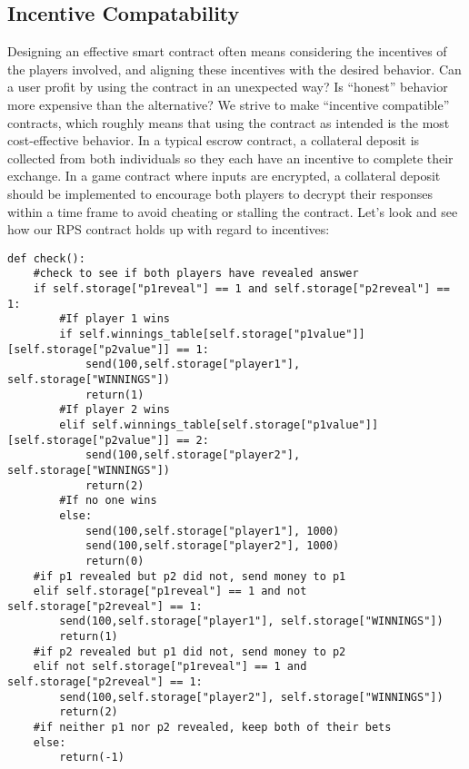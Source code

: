 \documentclass[10pt,twocolumn,letterpaper]{article}
\begin{document}
\subsection{Incentive Compatability}
Designing an effective smart contract often means considering the incentives of the players involved, and aligning these incentives with the desired behavior. Can a user profit by using the contract in an unexpected way? Is ``honest'' behavior more expensive than the alternative?  We strive to make ``incentive compatible'' contracts, which roughly means that using the contract as intended is the most cost-effective behavior. In a typical escrow contract, a collateral deposit is collected from both individuals so they each have an incentive to complete their exchange. In a game contract where inputs are encrypted, a collateral deposit should be implemented to encourage both players to decrypt their responses within a time frame to avoid cheating or stalling the contract.  Let's look and see how our RPS contract holds up with regard to incentives:

\begin{mdframed}
\begin{verbatim}
def check():
	#check to see if both players have revealed answer
	if self.storage["p1reveal"] == 1 and self.storage["p2reveal"] == 1:
		#If player 1 wins
		if self.winnings_table[self.storage["p1value"]][self.storage["p2value"]] == 1:
			send(100,self.storage["player1"], self.storage["WINNINGS"])
			return(1)
		#If player 2 wins
		elif self.winnings_table[self.storage["p1value"]][self.storage["p2value"]] == 2:
			send(100,self.storage["player2"], self.storage["WINNINGS"])
			return(2)
		#If no one wins
		else:
			send(100,self.storage["player1"], 1000)
			send(100,self.storage["player2"], 1000)
			return(0)
	#if p1 revealed but p2 did not, send money to p1
	elif self.storage["p1reveal"] == 1 and not self.storage["p2reveal"] == 1:
		send(100,self.storage["player1"], self.storage["WINNINGS"])
		return(1)
	#if p2 revealed but p1 did not, send money to p2
	elif not self.storage["p1reveal"] == 1 and self.storage["p2reveal"] == 1:
		send(100,self.storage["player2"], self.storage["WINNINGS"])
		return(2)
	#if neither p1 nor p2 revealed, keep both of their bets
	else:
		return(-1)
\end{verbatim}
\end{mdframed}
\end{document}
